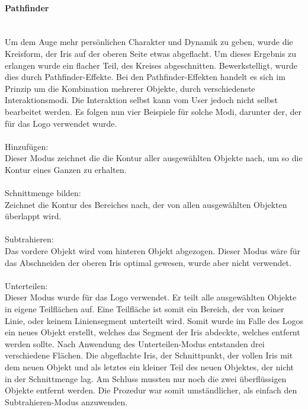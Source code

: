 \paragraph{Pathfinder}
\leavevmode \\
Um dem Auge mehr persönlichen Charakter und Dynamik zu geben, wurde die Kreisform, der Iris auf der oberen Seite etwas abgeflacht. Um dieses Ergebnis zu erlangen wurde ein flacher Teil, des Kreises abgeschnitten. Bewerkstelligt, wurde dies durch Pathfinder-Effekte. Bei den Pathfinder-Effekten handelt es sich im Prinzip um die Kombination mehrerer Objekte, durch verschiedenste Interaktionsmodi. Die Interaktion selbst kann vom User jedoch nicht selbst bearbeitet werden. Es folgen nun vier Beispiele für solche Modi, darunter der, der für das Logo verwendet wurde.\cite{kombinieren}\cite{pathfinder}
\leavevmode \\
\leavevmode \\
Hinzufügen:
\leavevmode \\
Dieser Modus zeichnet die die Kontur aller ausgewählten Objekte nach, um so die Kontur eines Ganzen zu erhalten.\cite{anwenden}
\leavevmode \\
\leavevmode \\
Schnittmenge bilden:
\leavevmode \\
Zeichnet die Kontur des Bereiches nach, der von allen ausgewählten Objekten überlappt wird.\cite{anwenden}
\leavevmode \\
\leavevmode \\
Subtrahieren:
\leavevmode \\
Das vordere Objekt wird vom hinteren Objekt abgezogen. Dieser Modus wäre für das Abschneiden der oberen Iris optimal gewesen, wurde aber nicht verwendet.\cite{anwenden}
\leavevmode \\
\leavevmode \\
Unterteilen:
\leavevmode \\
Dieser Modus wurde für das Logo verwendet. Er teilt alle ausgewählten Objekte in eigene Teilflächen auf. Eine Teilfläche ist somit ein Bereich, der von keiner Linie, oder keinem Liniensegment unterteilt wird. Somit wurde im Falle des Logos ein neues Objekt erstellt, welches das Segment der Iris abdeckte, welches entfernt werden sollte. Nach Anwendung des Unterteilen-Modus entstanden drei verschiedene Flächen. Die abgeflachte Iris, der Schnittpunkt, der vollen Iris mit dem neuen Objekt und als letztes ein kleiner Teil des neuen Objektes, der nicht in der Schnittmenge lag. Am Schluss mussten nur noch die zwei überflüssigen Objekte entfernt werden. Die Prozedur war somit umständlicher, als einfach den Subtrahieren-Modus anzuwenden.\cite{anwenden}
\leavevmode \\


